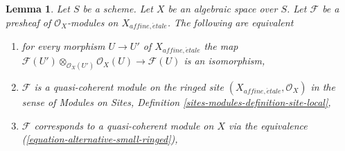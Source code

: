 \documentclass{stacks-project}
\theoremstyle{plain}
\newtheorem{lemma}[subsection]{Lemma}
\theoremstyle{definition}
\theoremstyle{remark}
\numberwithin{equation}{subsection}
\def\etale{{\acute{e}tale}}
\begin{document}
\begin{lemma}
\label{lemma-quasi-coherent-alternative-small}
Let $S$ be a scheme. Let $X$ be an algebraic space over $S$.
Let $\mathcal{F}$ be a presheaf of $\mathcal{O}_X$-modules
on $X_{affine, \etale}$. The following are equivalent
\begin{enumerate}
\item for every morphism $U \to U'$ of $X_{affine, \etale}$ the map
$\mathcal{F}(U') \otimes_{\mathcal{O}_X(U')} \mathcal{O}_X(U)
\to \mathcal{F}(U)$ is an isomorphism,
\item $\mathcal{F}$ is a quasi-coherent module on the ringed site
$(X_{affine, \etale}, \mathcal{O}_X)$ in the sense of
Modules on Sites, Definition \ref{sites-modules-definition-site-local},
\item $\mathcal{F}$ corresponds to a quasi-coherent module on $X$
via the equivalence (\ref{equation-alternative-small-ringed}),
\end{enumerate}
\end{lemma}
\end{document}
